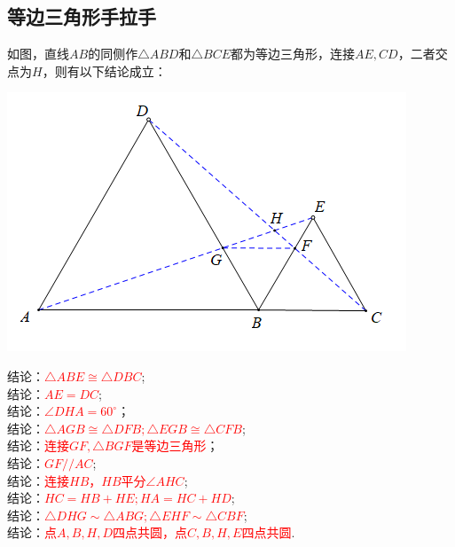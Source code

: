 \documentclass[10pt]{ctexart}
\begin{document}
\subsection{等边三角形手拉手}
如图，直线$AB$的同侧作$\triangle ABD$和$\triangle BCE$都为等边三角形，连接$AE,CD$，二者交点为$H$，则有以下结论成立：

\begin{minipage}{0.4\textwidth}
	\includegraphics[scale=0.6]{figure/shoulashou03}
\end{minipage}
\begin{minipage}{0.6\textwidth}
 结论：\textcolor{red}{$\triangle ABE\cong \triangle DBC$};\\
结论：\textcolor{red}{$AE=DC$};\\
结论：\textcolor{red}{$\angle DHA=60^\circ$}；\\
结论：\textcolor{red}{$\triangle AGB\cong \triangle DFB;\triangle EGB\cong \triangle CFB$};\\
结论：\textcolor{red}{连接$GF,\triangle BGF$是等边三角形}；\\
结论：\textcolor{red}{$GF//AC$};\\
结论：\textcolor{red}{连接$HB$，$HB$平分$\angle AHC$};\\
结论：\textcolor{red}{$HC=HB+HE;HA=HC+HD$};\\
结论：\textcolor{red}{$\triangle DHG\sim \triangle ABG;\triangle EHF\sim \triangle CBF$};\\
结论：\textcolor{red}{点$A,B,H,D$四点共圆，点$C,B,H,E$四点共圆}.
\end{minipage}
\end{document}
